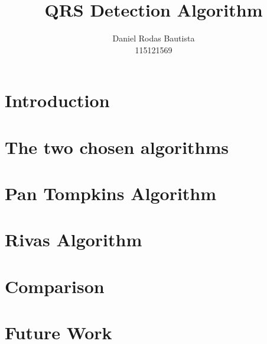 \documentclass{article}
\title{QRS Detection Algorithm}
\author{Daniel Rodas Bautista\\
115121569}
\begin{document}
\maketitle

\section{Introduction}

\section{The two chosen algorithms}

\section{Pan Tompkins Algorithm}

\section{Rivas Algorithm}

\section{Comparison}

\section{Future Work} %
\end{document}
